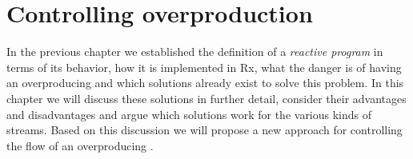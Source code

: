 \chapter{Controlling overproduction}
\label{chap:exploring-the-problem-space}
In the previous chapter we established the definition of a \textit{reactive program} in terms of its behavior, how it is implemented in Rx, what the danger is of having an overproducing \obs and which solutions already exist to solve this problem. In this chapter we will discuss these solutions in further detail, consider their advantages and disadvantages and argue which solutions work for the various kinds of streams. Based on this discussion we will propose a new approach for controlling the flow of an overproducing \obs.







